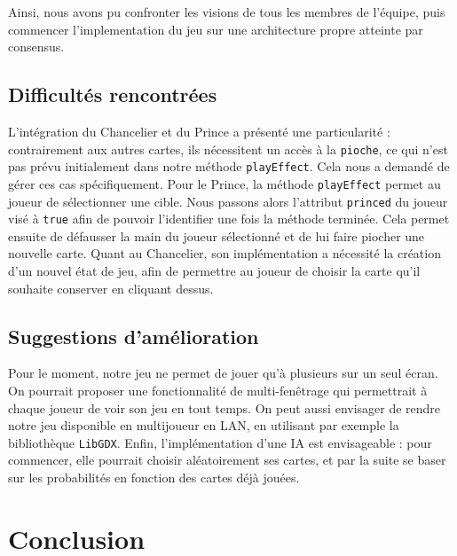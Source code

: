\documentclass[paper=a4,fontsize=12pt,titlepage]{scrartcl}
\begin{document}
    Ainsi, nous avons pu confronter les visions de tous les membres de l'équipe, puis commencer l'implementation du jeu
    sur une architecture propre atteinte par consensus.

    \subsection{Difficultés rencontrées}\label{subsec:difficultes-rencontrees}

    L'intégration du Chancelier et du Prince a présenté une particularité : contrairement aux autres cartes, ils
    nécessitent un accès à la \texttt{pioche}, ce qui n'est pas prévu initialement dans notre méthode \texttt{playEffect}.
    Cela nous a demandé de gérer ces cas spécifiquement.
    Pour le Prince, la méthode \verb|playEffect| permet au joueur de sélectionner une cible.
    Nous passons alors l'attribut \verb|princed| du joueur visé à \verb|true| afin de pouvoir l'identifier une fois
    la méthode terminée. Cela permet ensuite de défausser la main du joueur sélectionné et de lui faire piocher une nouvelle carte.
    Quant au Chancelier, son implémentation a nécessité la création d'un nouvel état de jeu,
    afin de permettre au joueur de choisir la carte qu'il souhaite conserver en cliquant dessus.
    
    \subsection{Suggestions d'amélioration}\label{subsec:suggestions-d'amelioration}

    Pour le moment, notre jeu ne permet de jouer qu’à plusieurs sur un seul écran. On pourrait proposer une
    fonctionnalité de multi-fenêtrage qui permettrait à chaque joueur de voir son jeu en tout temps.
    On peut aussi envisager de rendre notre jeu disponible en multijoueur en LAN, en utilisant par exemple la bibliothèque \verb|LibGDX|.
    Enfin, l’implémentation d’une IA est envisageable : pour commencer, elle pourrait choisir aléatoirement ses cartes,
    et par la suite se baser sur les probabilités en fonction des cartes déjà jouées.

    \newpage
    \section{Conclusion}\label{sec:conclusion}
\end{document}
